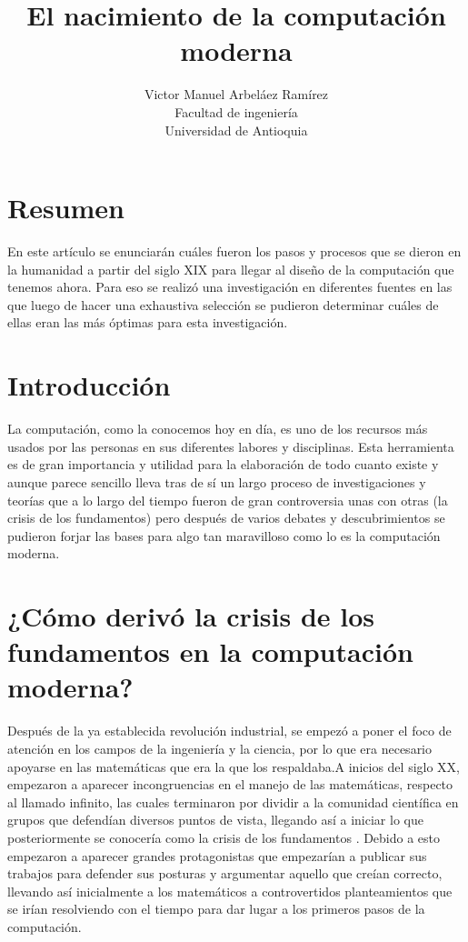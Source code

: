 \documentclass[12pt, letter]{article}
\title{\huge{El nacimiento de la computación moderna}}
\author{Victor Manuel Arbeláez Ramírez \\ Facultad de ingeniería \\ Universidad de Antioquia}
\date{}
\begin{document}
\raggedright

\maketitle

\section*{Resumen}

En este artículo se enunciarán cuáles fueron los pasos y procesos que se dieron en la humanidad a partir del siglo XIX para llegar al diseño de la computación que tenemos ahora. Para eso se realizó una investigación en diferentes fuentes en las que luego de hacer una exhaustiva selección se pudieron determinar cuáles de ellas eran las más óptimas para esta investigación.

\section*{Introducción}
La computación, como la conocemos hoy en día, es uno de los recursos más usados por las personas en sus diferentes labores y disciplinas. Esta herramienta es de gran importancia y utilidad para la elaboración de todo cuanto existe y aunque parece sencillo lleva tras de sí un largo proceso de investigaciones y teorías que a lo largo del tiempo fueron de gran controversia unas con otras (la crisis de los fundamentos) pero después de varios debates y descubrimientos se pudieron forjar las bases para algo tan maravilloso como lo es la computación moderna.

\section*{¿Cómo derivó la crisis de los fundamentos en la computación moderna?}

\setlength{\parindent}{31pt}
Después de la ya establecida revolución industrial, se empezó a poner el foco de atención en los campos de la ingeniería y la ciencia, por lo que era necesario apoyarse en las matemáticas que era la que los respaldaba.A inicios del siglo XX, empezaron a aparecer incongruencias en el manejo de las matemáticas, respecto al llamado infinito, las cuales terminaron por dividir a la comunidad científica en grupos que defendían diversos puntos de vista, llegando así a iniciar lo que posteriormente se conocería como la crisis de los fundamentos \parencite{computacionm}. Debido a esto empezaron a aparecer grandes protagonistas que empezarían a publicar sus trabajos para defender sus posturas y argumentar aquello que creían correcto, llevando así inicialmente a los matemáticos a controvertidos planteamientos que se irían resolviendo con el tiempo para dar lugar a los primeros pasos de la computación.
\end{document}
